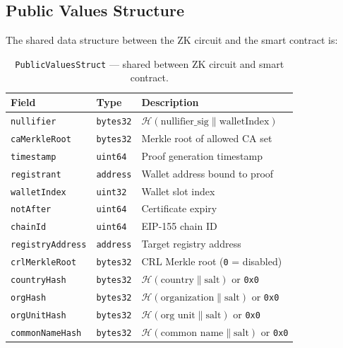\documentclass[11pt, a4paper]{article}
\begin{document}
\subsection{Public Values
Structure}\label{public-values-structure}

The shared data structure between the ZK circuit and the smart contract
is:

\begin{table}[ht]
\centering
\small
\caption{\texttt{PublicValuesStruct} --- shared between ZK circuit and smart contract.}
\label{tab:public-values}
\begin{tabular}{@{}lll@{}}
\toprule
Field & Type & Description \\
\midrule
\texttt{nullifier} & \texttt{bytes32} & $\mathcal{H}(\text{nullifier\_sig} \| \text{walletIndex})$ \\
\texttt{caMerkleRoot} & \texttt{bytes32} & Merkle root of allowed CA set \\
\texttt{timestamp} & \texttt{uint64} & Proof generation timestamp \\
\texttt{registrant} & \texttt{address} & Wallet address bound to proof \\
\texttt{walletIndex} & \texttt{uint32} & Wallet slot index \\
\texttt{notAfter} & \texttt{uint64} & Certificate expiry \\
\texttt{chainId} & \texttt{uint64} & EIP-155 chain ID \\
\texttt{registryAddress} & \texttt{address} & Target registry address \\
\texttt{crlMerkleRoot} & \texttt{bytes32} & CRL Merkle root (\texttt{0} = disabled) \\
\texttt{countryHash} & \texttt{bytes32} & $\mathcal{H}(\text{country} \| \text{salt})$ or \texttt{0x0} \\
\texttt{orgHash} & \texttt{bytes32} & $\mathcal{H}(\text{organization} \| \text{salt})$ or \texttt{0x0} \\
\texttt{orgUnitHash} & \texttt{bytes32} & $\mathcal{H}(\text{org unit} \| \text{salt})$ or \texttt{0x0} \\
\texttt{commonNameHash} & \texttt{bytes32} & $\mathcal{H}(\text{common name} \| \text{salt})$ or \texttt{0x0} \\
\bottomrule
\end{tabular}
\end{table}
\end{document}
